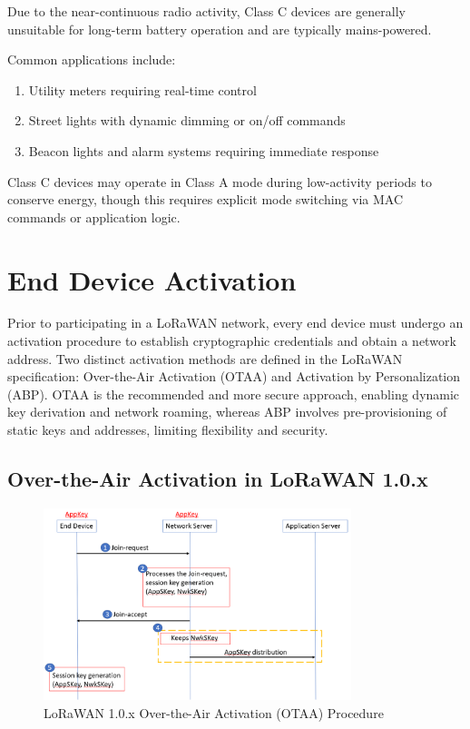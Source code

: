 Due to the near-continuous radio activity, Class C devices are generally unsuitable for long-term battery operation and are typically mains-powered.

Common applications include:

\begin{enumerate}
    \item Utility meters requiring real-time control
    \item Street lights with dynamic dimming or on/off commands
    \item Beacon lights and alarm systems requiring immediate response
\end{enumerate}

Class C devices may operate in Class A mode during low-activity periods to conserve energy, though this requires explicit mode switching via MAC commands or application logic.


\section{End Device Activation}

Prior to participating in a LoRaWAN network, every end device must undergo an activation procedure to establish cryptographic credentials and obtain a network address. Two distinct activation methods are defined in the LoRaWAN specification: Over-the-Air Activation (OTAA) and Activation by Personalization (ABP). OTAA is the recommended and more secure approach, enabling dynamic key derivation and network roaming, whereas ABP involves pre-provisioning of static keys and addresses, limiting flexibility and security.

\subsection{Over-the-Air Activation in LoRaWAN 1.0.x}
\begin{figure}[htbp]
    \centering
    \includegraphics[width=0.8\textwidth]{figures/otaa-lorawan1.0.png}
    \caption{LoRaWAN 1.0.x Over-the-Air Activation (OTAA) Procedure}
    \label{fig:lora_otaa_1.0}
\end{figure}

